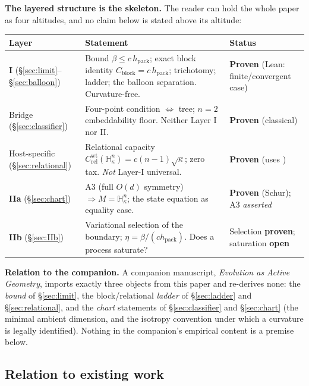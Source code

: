 \documentclass[11pt,reqno]{amsart}
\theoremstyle{plain}
\theoremstyle{definition}
\newcommand{\hpack}{h_{\mathrm{pack}}}
\newcommand{\Crel}{C_{\mathrm{rel}}}
\newcommand{\Cblock}{C_{\mathrm{block}}}
\newcommand{\Hk}{\mathbb{H}^n_\kappa}
\begin{document}
\medskip
\noindent\textbf{The layered structure is the skeleton.} The reader can hold the whole paper as four altitudes, and no claim below is stated above its altitude:

\begin{center}\small
\begin{tabular}{@{}>{\raggedright\arraybackslash}p{2.1cm}>{\raggedright\arraybackslash}p{7.0cm}>{\raggedright\arraybackslash}p{3.6cm}@{}}
\toprule
\textbf{Layer} & \textbf{Statement} & \textbf{Status} \\
\midrule
\textbf{I} (\S\ref{sec:limit}--\S\ref{sec:balloon}) & Bound $\beta\le c\,\hpack$; exact block identity $\Cblock=c\,\hpack$; trichotomy; ladder; the balloon separation. Curvature-free. & \textbf{Proven} (Lean: finite/convergent case) \\
Bridge (\S\ref{sec:classifier}) & Four-point condition $\Leftrightarrow$ tree; $n=2$ embeddability floor. Neither Layer I nor II. & \textbf{Proven} (classical) \\
Host-specific (\S\ref{sec:relational}) & Relational capacity $\Crel^{\mathrm{wt}}(\Hk)=c(n-1)\sqrt\kappa$; zero tax. \emph{Not} Layer-I universal. & \textbf{Proven} (uses \cite{skenderi2026}) \\
\textbf{IIa} (\S\ref{sec:chart}) & A3 (full $O(d)$ symmetry) $\Rightarrow M=\Hk$; the state equation as equality case. & \textbf{Proven} (Schur); A3 \emph{asserted} \\
\textbf{IIb} (\S\ref{sec:IIb}) & Variational selection of the boundary; $\eta=\beta/(c\hpack)$. Does a process saturate? & Selection \textbf{proven}; saturation \textbf{open} \\
\bottomrule
\end{tabular}
\end{center}

\medskip
\noindent\textbf{Relation to the companion.} A companion manuscript, \emph{Evolution as Active Geometry}, imports exactly three objects from this paper and re-derives none: the \emph{bound} of \S\ref{sec:limit}, the block/relational \emph{ladder} of \S\ref{sec:ladder} and \S\ref{sec:relational}, and the \emph{chart} statements of \S\ref{sec:classifier} and \S\ref{sec:chart} (the minimal ambient dimension, and the isotropy convention under which a curvature is legally identified). Nothing in the companion's empirical content is a premise below.

\subsection{Relation to existing work}\label{sec:related}
\end{document}

